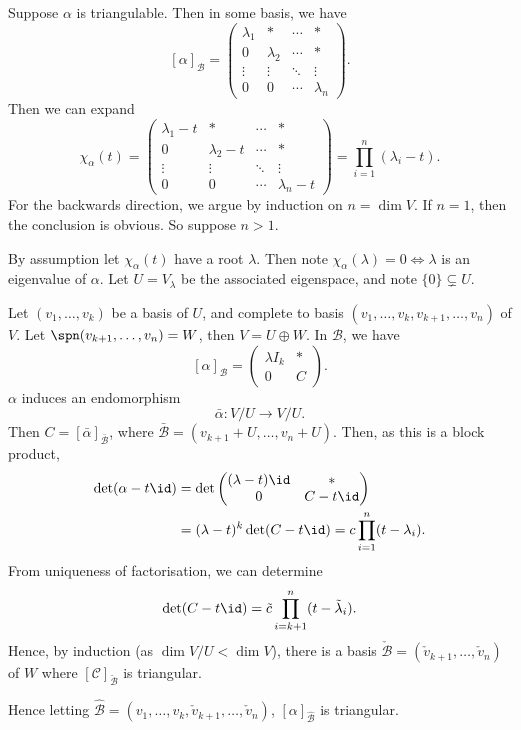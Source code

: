 \documentclass[12pt]{article}
\begin{document}
\begin{proofbox}
	Suppose $\alpha$ is triangulable. Then in some basis, we have
	\[
		[\alpha]_{\mathcal{B}}=
		\begin{pmatrix}
			\lambda_1 & \ast & \cdots & \ast \\
			0 & \lambda_2 & \cdots & \ast \\
			\vdots & \vdots & \ddots & \vdots \\
			0 & 0 & \cdots & \lambda_n
		\end{pmatrix}
	.\]
	Then we can expand
	 \[
		 \chi_{\alpha}(t) =
			\begin{pmatrix}
				\lambda_1 - t & \ast & \cdots & \ast \\
				0 & \lambda_2 - t & \cdots & \ast \\
				\vdots & \vdots & \ddots & \vdots \\
				0 & 0 & \cdots & \lambda_n - t
			\end{pmatrix}
			= \prod_{i = 1}^{n}(\lambda_i - t)
	.\]
	For the backwards direction, we argue by induction on $n = \dim V$. If $n = 1$, then the conclusion is obvious. So suppose $n > 1$.

	By assumption let $\chi_{\alpha}(t)$ have a root $\lambda$. Then note $\chi_{\alpha}(\lambda) = 0 \iff \lambda$ is an eigenvalue of $\alpha$. Let $U=  V_{\lambda}$ be the associated eigenspace, and note $\{0\} \subsetneq U$.

		Let $(v_1, \ldots, v_k)$ be a basis of $U$, and complete to basis $(v_1, \ldots, v_k, v_{k+1}, \ldots, v_n)$ of $V$. Let $\spn(v_{k+1}, \ldots, v_n) = W$, then $V = U \oplus W$. In $\mathcal{B}$, we have
		\[
			[\alpha]_{\mathcal{B}} =
			\begin{pmatrix}
				\lambda I_k & \ast \\
				0 & C
			\end{pmatrix}
		.\]
		$\alpha$ induces an endomorphism
		\[
		\bar \alpha : V / U \to V/U
		.\]
		Then $C = [\bar \alpha]_{\bar{\mathcal{B}}}$, where $\bar{\mathcal{B}} = (v_{k+1} + U, \ldots, v_n + U)$. Then, as this is a block product,
		\begin{align*}
			\det(\alpha - t \id) &= \det
			\begin{pmatrix}
				(\lambda - t)\id & \ast \\
				0 & C - t \id
			\end{pmatrix}
			\\
					     &= (\lambda-t)^{k}\det(C - t\id) = c \prod_{i= 1}^{n} (t - \lambda_i).
		\end{align*}
		From uniqueness of factorisation, we can determine
		\[
			\det(C - t \id) = \tilde c \prod_{i = k+1}^{n} (t - \tilde \lambda_i)
		.\]
		Hence, by induction (as $\dim V/U < \dim V$), there is a basis $\check{\mathcal{B}} = (\check{v}_{k+1}, \ldots, \check v_{n})$ of $W$ where $[\mathcal{C}]_{\check{\mathcal{B}}}$ is triangular.

		Hence letting $\hat{\mathcal{B}} = (v_1, \ldots, v_k, \check v_{k+1}, \ldots, \check v_n)$, $[\alpha]_{\hat{\mathcal{B}}}$ is triangular.
\end{proofbox}
\end{document}
